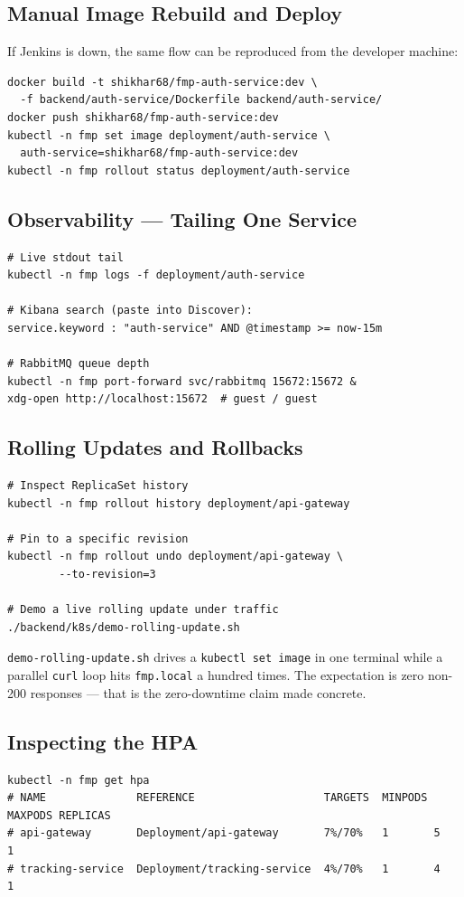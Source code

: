 \documentclass[11pt,a4paper]{article}
\begin{document}
\subsection{Manual Image Rebuild and Deploy}
If Jenkins is down, the same flow can be reproduced from the
developer machine:

\begin{lstlisting}
docker build -t shikhar68/fmp-auth-service:dev \
  -f backend/auth-service/Dockerfile backend/auth-service/
docker push shikhar68/fmp-auth-service:dev
kubectl -n fmp set image deployment/auth-service \
  auth-service=shikhar68/fmp-auth-service:dev
kubectl -n fmp rollout status deployment/auth-service
\end{lstlisting}

\subsection{Observability — Tailing One Service}
\begin{lstlisting}
# Live stdout tail
kubectl -n fmp logs -f deployment/auth-service

# Kibana search (paste into Discover):
service.keyword : "auth-service" AND @timestamp >= now-15m

# RabbitMQ queue depth
kubectl -n fmp port-forward svc/rabbitmq 15672:15672 &
xdg-open http://localhost:15672  # guest / guest
\end{lstlisting}

\subsection{Rolling Updates and Rollbacks}
\begin{lstlisting}
# Inspect ReplicaSet history
kubectl -n fmp rollout history deployment/api-gateway

# Pin to a specific revision
kubectl -n fmp rollout undo deployment/api-gateway \
        --to-revision=3

# Demo a live rolling update under traffic
./backend/k8s/demo-rolling-update.sh
\end{lstlisting}

\texttt{demo-rolling-update.sh} drives a \texttt{kubectl set image}
in one terminal while a parallel \texttt{curl} loop hits
\texttt{fmp.local} a hundred times.  The expectation is zero
non-200 responses — that is the zero-downtime claim made
concrete.

\subsection{Inspecting the HPA}
\begin{lstlisting}
kubectl -n fmp get hpa
# NAME              REFERENCE                    TARGETS  MINPODS MAXPODS REPLICAS
# api-gateway       Deployment/api-gateway       7%/70%   1       5       1
# tracking-service  Deployment/tracking-service  4%/70%   1       4       1
\end{lstlisting}
\end{document}
